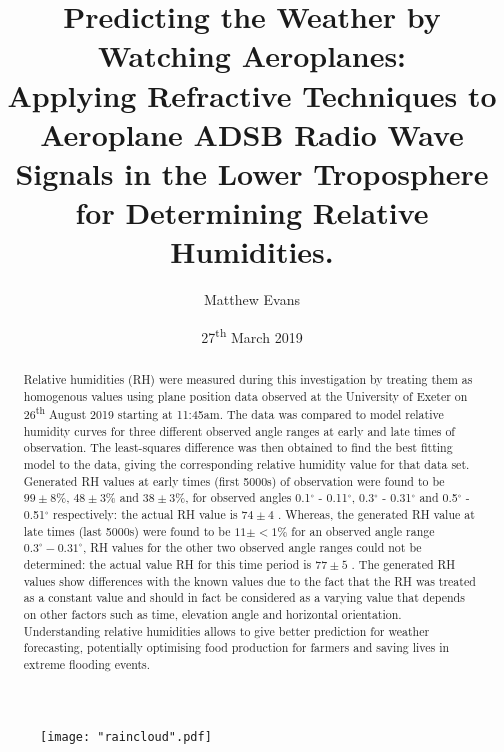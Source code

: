 \documentclass{article}
\title{\textbf{\huge Predicting the Weather by Watching Aeroplanes: 
\\ 
\Large
Applying Refractive Techniques to Aeroplane ADSB Radio Wave Signals in the Lower Troposphere for Determining Relative Humidities.}}
\author{Matthew Evans}%
\date{27\textsuperscript{th} March 2019} %
\begin{document}
\maketitle %

\begin{figure}[h]
\centering
\texttt{[image: "raincloud".pdf]}
\label{fig:raincloud}
\end{figure}

\thispagestyle{empty}
\newpage



\vspace*{\fill}
\begin{abstract}

\noindent
Relative humidities (RH) were measured during this investigation by treating them as homogenous values using plane position data observed at the University of Exeter on 26\textsuperscript{th} August 2019 starting at 11:45am. The data was compared to model relative humidity curves for three different observed angle ranges at early and late times of observation. The least-squares difference was then obtained to find the best fitting model to the data, giving the corresponding relative humidity value for that data set. Generated RH values at early times (first 5000s) of observation were found to be $99 \pm 8\%$, $48 \pm 3\%$ and $38 \pm 3\%$, for observed angles 0.1$^{\circ}$ - 0.11$^{\circ}$, 0.3$^{\circ}$ - 0.31$^{\circ}$ and 0.5$^{\circ}$ - 0.51$^{\circ}$ respectively: the actual RH value is $74 \pm 4$ \cite{Web01}. Whereas, the generated RH value at late times (last 5000s) were found to be $11 \pm <1\%$ for an observed angle range $0.3^{\circ} - 0.31^{\circ}$, RH values for the other two observed angle ranges could not be determined: the actual value RH for this time period is $77 \pm 5$ \cite{Web01}. The generated RH values show differences with the known values due to the fact that the RH was treated as a constant value and should in fact be considered as a varying value that depends on other factors such as time, elevation angle and horizontal orientation. Understanding relative humidities allows to give better prediction for weather forecasting, potentially optimising food production for farmers and saving lives in extreme flooding events.
\thispagestyle{empty}
\end{abstract}
\vspace*{\fill}

\vspace{5mm} %
\end{document}
